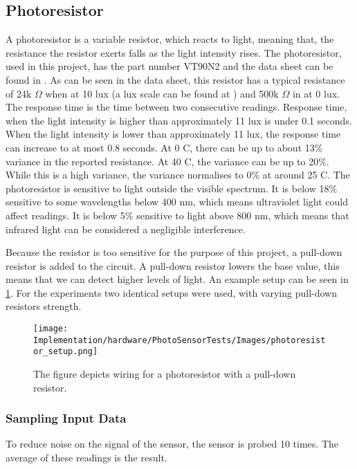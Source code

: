 \subsection{Photoresistor}\label{sub:photoresistor}
A photoresistor is a variable resistor, which reacts to light, meaning that, the resistance the resistor exerts falls as the light intensity rises. The photoresistor, used in this project, has the part number VT90N2 and the data sheet can be found in \cite{photoresistor_sheet}. As can be seen in the data sheet, this resistor has a typical resistance of 24k $\Omega$ when at 10 lux (a lux scale can be found at \cite{lux_scale}) and 500k $\Omega$ in at 0 lux. The response time is the time between two consecutive readings. Response time, when the light intensity is higher than approximately 11 lux is under 0.1 seconds. When the light intensity is lower than approximately 11 lux, the response time can increase to at most 0.8 seconds. At 0 \degree C, there can be up to about 13\% variance in the reported resistance. At 40 \degree C, the variance can be up to 20\%. While this is a high variance, the variance normalises to 0\% at around 25 \degree C. The photoresistor is sensitive to light outside the visible spectrum. It is below 18\% sensitive to some wavelengths below 400 nm, which means ultraviolet light could affect readings. It is below 5\% sensitive to light above 800 nm, which means that infrared light can be considered a negligible interference.

Because the resistor is too sensitive for the purpose of this project, a pull-down resistor is added to the circuit\cite{pulldown_resistor}. A pull-down resistor lowers the base value, this means that we can detect higher levels of light. An example setup can be seen in \cref{fig:arduino_photoresistor_wiring}. For the experiments two identical setups were used, with varying pull-down resistors strength.

\begin{figure}[htbp]
  \centering
  \texttt{[image: Implementation/hardware/PhotoSensorTests/Images/photoresistor\_setup.png]}
  \caption[Photoresistor]{The figure depicts wiring for a photoresistor with a pull-down resistor.}\label{fig:arduino_photoresistor_wiring}
\end{figure}

\subsubsection{Sampling Input Data}
To reduce noise on the signal of the sensor, the sensor is probed 10 times. The average of these readings is the result.
